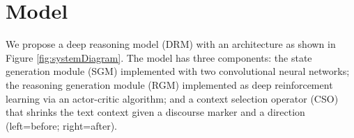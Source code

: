 \section{Model}
We propose a deep reasoning model (DRM) with an architecture as shown in Figure \ref{fig:systemDiagram}. The model has three components: the state generation module (SGM) implemented with two convolutional neural networks; the reasoning generation module (RGM) implemented as deep reinforcement learning via an actor-critic algorithm; and a context selection operator (CSO) that shrinks the text context given a discourse marker and a direction (left=before; right=after).




